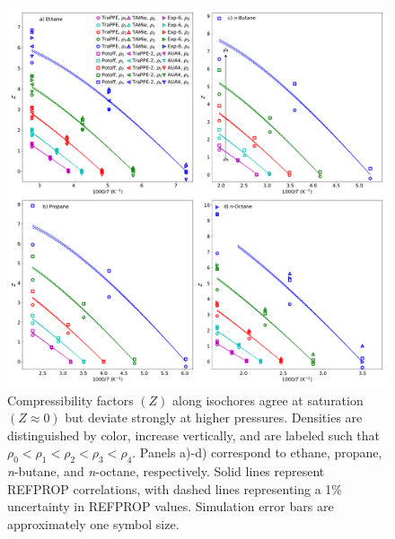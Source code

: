 \documentclass[journal=jctc,manuscript=article]{achemso}
\begin{document}
\begin{figure}[htb!]
	\centering
	\includegraphics[width=6.4in]{IC_normal_alkanes_all_models}
	\caption{Compressibility factors $(Z)$ along isochores agree at saturation $(Z \approx 0)$ but deviate strongly at higher pressures. Densities are distinguished by color, increase vertically, and are labeled such that $\rho_0 < \rho_1 < \rho_2 < \rho_3 < \rho_4$.  Panels a)-d) correspond to ethane, propane, \textit{n}-butane, and \textit{n}-octane, respectively.
Solid lines represent REFPROP correlations, with dashed lines representing a 1\% uncertainty in REFPROP values. Simulation error bars are approximately one symbol size.}
	\label{fig:IC_normal_alkanes}
\end{figure}
\end{document}
